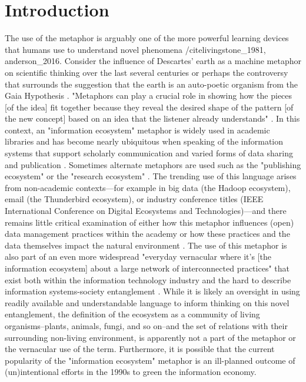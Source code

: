 \section{Introduction}

The use of the metaphor is arguably one of the more powerful learning devices that humans use to understand novel phenomena /cite{livingstone_1981, anderson_2016}. Consider the influence of Descartes' earth as a machine metaphor on scientific thinking over the last several centuries \cite{abram_1991} or perhaps the controversy that surrounds the suggestion that the earth is an auto-poetic organism from the Gaia Hypothesis \cite{lovelock_1974}. "Metaphors can play a crucial role in showing how the pieces [of the idea] fit together because they reveal the desired shape of the pattern [of the new concept] based on an idea that the listener already understands" \cite{anderson_2016}. In this context, an "information ecosystem" metaphor is widely used in academic libraries and has become nearly ubiquitous when speaking of the information systems that support scholarly communication and varied forms of data sharing and publication \cite[for example see][]{walter_2008}. Sometimes alternate metaphors are used such as the "publishing ecosystem" or the "research ecosystem" \cite[for respective examples see][]{esposito_2013,dylla_2016}. The trending use of this language arises from non-academic contexts—for example in big data (the Hadoop ecosystem), email (the Thunderbird ecosystem), or industry conference titles (IEEE International Conference on Digital Ecosystems and Technologies)—and there remains little critical examination of either how this metaphor influences (open) data management practices within the academy or how these practices and the data themselves impact the natural environment \cite[although see][]{stepp_1999}. The use of this metaphor is also part of an even more widespread "everyday vernacular where it’s [the information ecosystem] about a large network of interconnected practices" that exist both within the information technology industry and the hard to describe information systems-society entanglement \cite{boyd_2016}. While it is likely an oversight in using readily available and understandable language to inform thinking on this novel entanglement, the definition of the ecosystem as a community of living organisms--plants, animals, fungi, and so on--and the set of relations with their surrounding non-living environment, is apparently not a part of the metaphor or the vernacular use of the term. Furthermore, it is possible that the current popularity of the "information ecosystem" metaphor is an ill-planned outcome of (un)intentional efforts in the 1990s to green the information economy.

